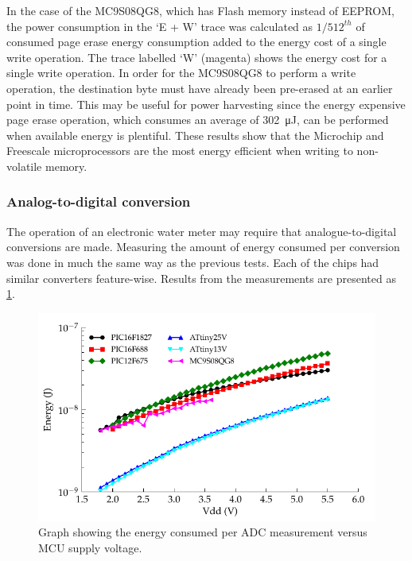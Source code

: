       In the case of the MC9S08QG8, which has Flash memory instead of EEPROM, the power consumption in the `E + W' trace was calculated as $1/512^{th}$ of consumed page erase energy consumption added to the energy cost of a single write operation.
      The trace labelled `W' (magenta) shows the energy cost for a single write operation.
      In order for the MC9S08QG8 to perform a write operation, the destination byte must have already been pre-erased at an earlier point in time.
      This may be useful for power harvesting since the energy expensive page erase operation, which consumes an average of \SI{302}{\micro\joule}, can be performed when available energy is plentiful.
      These results show that the Microchip and Freescale microprocessors are the most energy efficient when writing to non-volatile memory.



    \subsubsection{Analog-to-digital conversion}

      The operation of an electronic water meter may require that analogue-to-digital conversions are made.
      Measuring the amount of energy consumed per conversion was done in much the same way as the previous tests.
      Each of the chips had similar converters feature-wise.
      Results from the measurements are presented as \cref{fig:Energy-consumed-ADC}.

      \begin{figure}
        \centering
        \includegraphics{content/pt1/03-EnergyRequirements/graphics/Graph_ALL_ADC_JPM}
        \caption{\label{fig:Energy-consumed-ADC}Graph showing the energy consumed per ADC measurement versus MCU supply voltage.}
      \end{figure}



